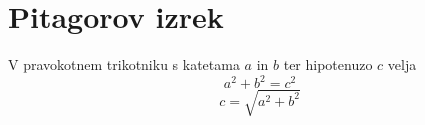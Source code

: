 \documentclass{article}
\begin{document}
\citation{}
\bibdata{}
\bibstyle{}
\section*{Pitagorov izrek}
V pravokotnem trikotniku s katetama \(a\) in \(b\) ter hipotenuzo \(c\) velja
\[ a^2 + b^2 = c^2\]
\[c = \sqrt{a^2 + b^2}\]
\end{document}
